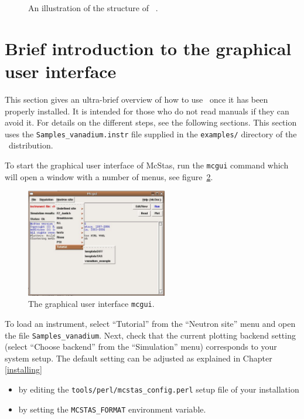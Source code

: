 \begin{figure}[htb!]
\begin{center}

\end{center}
\caption{An illustration of the structure of \MCS\ .}
\label{fig:structure}
\end{figure}

\section{Brief introduction to the graphical user interface}
\label{s:brief}

This section gives an ultra-brief overview of how to use \MCS\ once it
has been properly installed. It is intended for those who do not read
manuals if they can avoid it. For details on the different steps, see
the following sections. This section uses the
\verb+Samples_vanadium.instr+ file supplied in the \verb+examples/+
directory of the \MCS\ distribution. %

To start the graphical user interface of McStas, run the
\verb+mcgui+ command which will open a window
with a number of menus,
see figure~\ref{fig:mcgui}. 
\begin{figure}[htb!]
  \begin{center}
    \includegraphics[width=0.55\textwidth]{figures/mcgui.eps}
  \end{center}
\caption{The graphical user interface \texttt{mcgui}.}
\label{fig:mcgui}
\end{figure}
\label{p:neutronsite}
To load an instrument, select ``Tutorial'' from the ``Neutron site''
menu and open the file \verb+Samples_vanadium+. Next, check that the current plotting backend setting
(select ``Choose backend'' from the ``Simulation'' menu) corresponds
to your system setup. The default setting can be adjusted as explained in Chapter \ref{installing}
\begin{itemize}
\item{by editing
the \verb+tools/perl/mcstas_config.perl+ setup file of your
installation}
\item{by setting the \verb+MCSTAS_FORMAT+ environment
variable.}
\end{itemize} 

